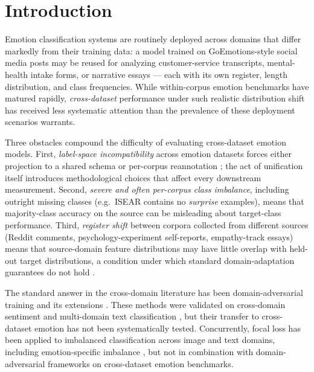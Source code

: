 \section{Introduction}
\label{sec:intro}

Emotion classification systems are routinely deployed across domains
that differ markedly from their training data: a model trained on
GoEmotions-style social media posts may be reused for analyzing
customer-service transcripts, mental-health intake forms, or
narrative essays — each with its own register, length distribution,
and class frequencies. While within-corpus emotion benchmarks have
matured rapidly, \emph{cross-dataset} performance under such
realistic distribution shift has received less systematic attention
than the prevalence of these deployment scenarios warrants.

Three obstacles compound the difficulty of evaluating
cross-dataset emotion models. First, \emph{label-space
incompatibility} across emotion datasets forces either projection to
a shared schema or per-corpus reannotation
\citep{bostan2018analysis}; the act of unification itself introduces
methodological choices that affect every downstream measurement.
Second, \emph{severe and often per-corpus class imbalance}, including
outright missing classes (e.g.\ ISEAR contains no
\emph{surprise} examples), means that majority-class accuracy on
the source can be misleading about target-class performance. Third,
\emph{register shift} between corpora collected from different
sources (Reddit comments, psychology-experiment self-reports,
empathy-track essays) means that source-domain feature distributions
may have little overlap with held-out target distributions, a
condition under which standard domain-adaptation guarantees do not
hold \citep{ben2010theory}.

The standard answer in the cross-domain literature has been
domain-adversarial training and its extensions \citep{ganin2016dann,
long2018cdan}. These methods were validated on cross-domain sentiment
\citep{glorot2011sentiment} and multi-domain text classification
\citep{chen2018multinomial}, but their transfer to cross-dataset
emotion has not been systematically tested. Concurrently, focal loss
\citep{lin2017focal} has been applied to imbalanced classification
across image and text domains, including emotion-specific imbalance
\citep{suresh2021labelaware}, but not in combination with domain-adversarial
frameworks on cross-dataset emotion benchmarks.

